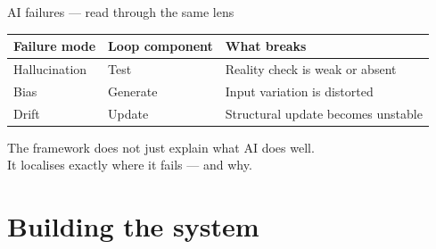 \documentclass[aspectratio=169, 10pt]{beamer}
\begin{document}
\begin{frame}{AI failures — read through the same lens}
  \begin{tabular}{lll}
    \toprule
    Failure mode   & Loop component & What breaks \\
    \midrule
    Hallucination  & Test           & Reality check is weak or absent \\
    Bias           & Generate       & Input variation is distorted \\
    Drift          & Update         & Structural update becomes unstable \\
    \bottomrule
  \end{tabular}

  \bigskip
  \begin{block}{}
    The framework does not just explain what AI does well.\\
    It localises exactly where it fails — and why.
  \end{block}
\end{frame}

\section{Building the system}
\end{document}
